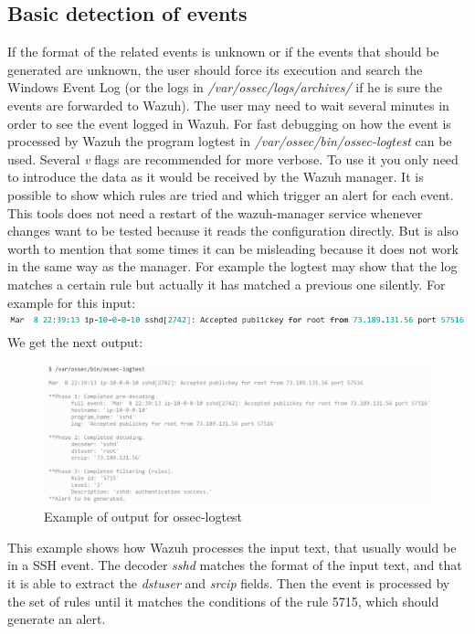 \subsection*{Basic detection of events}
If the format of the related events is unknown or if the events that should be generated are unknown, the user should force its execution and search the Windows Event Log (or the logs in \textit{/var/ossec/logs/archives/} if he is sure the events are forwarded to Wazuh).
The user may need to wait several minutes in order to see the event logged in Wazuh.
\linej
\linej
For fast debugging on how the event is processed by Wazuh the program logtest in \textit{/var/ossec/bin/ossec-logtest} can be used.
Several \textit{v} flags are recommended for more verbose.
To use it you only need to introduce the data as it would be received by the Wazuh manager.
It is possible to show which rules are tried and which trigger an alert for each event.
This tools does not need a restart of the wazuh-manager service whenever changes want to be tested because it reads the configuration directly.
\linej
But is also worth to mention that some times it can be misleading because it does not work in the same way as the manager.
For example the logtest may show that the log matches a certain rule but actually it has matched a previous one silently.
\linej
\linej
For example for this input:
\linej
\includegraphics[width=\textwidth]{figuras/ossec-logtest_input.png}
\linej
We get the next output:
\begin{figure}[H]
  \centering
	\includegraphics[width=\textwidth]{figuras/ossec-logtest_output.png}
	\caption{Example of output for ossec-logtest}
\end{figure}
\linej
This example shows how Wazuh processes the input text, that usually would be in a SSH event.
The decoder \textit{sshd} matches the format of the input text, and that it is able to extract the \textit{dstuser} and \textit{srcip} fields.
Then the event is processed by the set of rules until it matches the conditions of the rule 5715, which should generate an alert.
